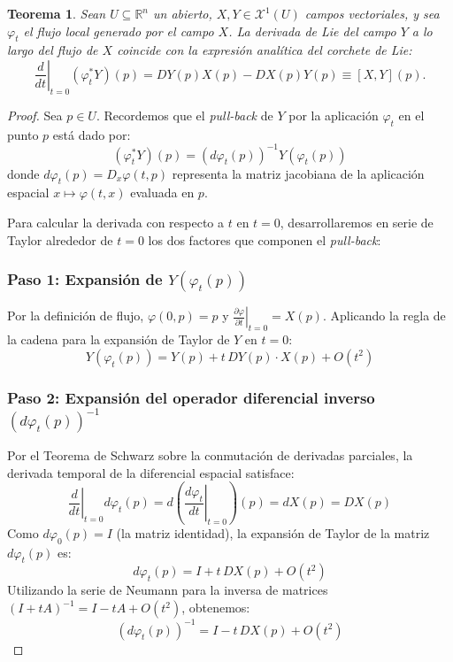 \documentclass[11pt,a4paper]{article}
\theoremstyle{definition}
\theoremstyle{plain}
\newtheorem{teorema}{Teorema}[section]
\theoremstyle{remark}
\begin{document}
	\begin{teorema}
		Sean $U \subseteq \mathbb{R}^n$ un abierto, $X, Y \in \mathcal{X}^1(U)$ campos vectoriales, y sea $\varphi_t$ el flujo local generado por el campo $X$. La derivada de Lie del campo $Y$ a lo largo del flujo de $X$ coincide con la expresión analítica del corchete de Lie:
		\[
		\left. \frac{d}{dt} \right|_{t=0} (\varphi_t^* Y)(p) = DY(p) X(p) - DX(p) Y(p) \equiv [X, Y](p).
		\]
	\end{teorema}
	
	\begin{proof}
		Sea $p \in U$. Recordemos que el \textit{pull-back} de $Y$ por la aplicación $\varphi_t$ en el punto $p$ está dado por:
		\[
		(\varphi_t^* Y)(p) = \left( d\varphi_t(p) \right)^{-1} Y(\varphi_t(p))
		\]
		donde $d\varphi_t(p) = D_x \varphi(t, p)$ representa la matriz jacobiana de la aplicación espacial $x \mapsto \varphi(t, x)$ evaluada en $p$.
		
		Para calcular la derivada con respecto a $t$ en $t=0$, desarrollaremos en serie de Taylor alrededor de $t=0$ los dos factores que componen el \textit{pull-back}:
		
		\subsubsection*{Paso 1: Expansión de $Y(\varphi_t(p))$}
		Por la definición de flujo, $\varphi(0, p) = p$ y $\left.\frac{\partial \varphi}{\partial t}\right|_{t=0} = X(p)$. Aplicando la regla de la cadena para la expansión de Taylor de $Y$ en $t=0$:
		\[
		Y(\varphi_t(p)) = Y(p) + t \, DY(p) \cdot X(p) + O(t^2)
		\]
		
		\subsubsection*{Paso 2: Expansión del operador diferencial inverso $(d\varphi_t(p))^{-1}$}
		Por el Teorema de Schwarz sobre la conmutación de derivadas parciales, la derivada temporal de la diferencial espacial satisface:
		\[
		\left. \frac{d}{dt} \right|_{t=0} d\varphi_t(p) = d \left( \left. \frac{d\varphi_t}{dt} \right|_{t=0} \right)(p) = dX(p) = DX(p)
		\]
		Como $d\varphi_0(p) = I$ (la matriz identidad), la expansión de Taylor de la matriz $d\varphi_t(p)$ es:
		\[
		d\varphi_t(p) = I + t \, DX(p) + O(t^2)
		\]
		Utilizando la serie de Neumann para la inversa de matrices $(I + t A)^{-1} = I - t A + O(t^2)$, obtenemos:
		\[
		\left( d\varphi_t(p) \right)^{-1} = I - t \, DX(p) + O(t^2)
		\]
		

\end{proof}
\end{document}
